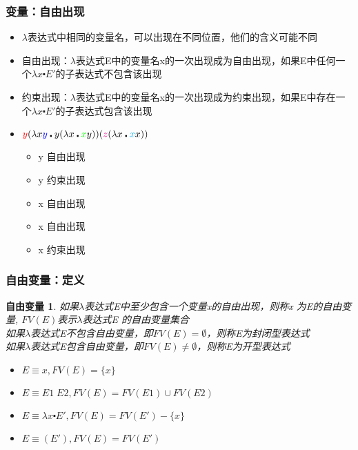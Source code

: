 \documentclass[CJKutf8,compress,hyperref]{beamer}
\begin{document}
\begin{CJK}{UTF8}{song}
\begin{frame} 
  \frametitle{变量：自由出现}  
  \begin{itemize}
  \item $\lambda$表达式中相同的变量名，可以出现在不同位置，他们的含义可能不同
  \item 自由出现：$\lambda$表达式E中的变量名x的一次出现成为自由出现，如果E中任何一个$\lambda x \centerdot E'$的子表达式不包含该出现 
  \item 约束出现：$\lambda$表达式E中的变量名x的一次出现成为约束出现，如果E中存在一个$\lambda x \centerdot E'$的子表达式包含该出现 
  \item ${\color{red}y}(\lambda x {\color{blue}y} \centerdot
    y (\lambda x \centerdot {\color{green}x}y))
    ({\color{magenta}z} (\lambda x \centerdot {\color{cyan}x}x))$ 
    \begin{itemize} 
    \item {\color{red}y} 自由出现
    \item {\color{blue}y} 约束出现 
    \item {\color{green}x} 自由出现 
    \item {\color{magenta}x} 自由出现 
    \item {\color{cyan}x} 约束出现 
    \end{itemize} 
  \end{itemize}  
\end{frame}

\begin{frame}
  \frametitle{自由变量：定义} 
  \newtheorem{fv}{自由变量} 
  \begin{fv}
    如果$\lambda$表达式E中至少包含一个变量x的自由出现，则称x
    为E的{\color{red}自由变量}, $FV(E)$表示$\lambda$表达式E
    的自由变量集合 \\ 
    如果$\lambda$表达式E不包含自由变量，即$FV(E) = \emptyset$，则称E为封闭型表达式\\ 
    如果$\lambda$表达式E包含自由变量，即$FV(E) \neq \emptyset$，则称E为开型表达式
  \end{fv} 
  \begin{itemize}
  \item  
    $E \equiv x , FV(E) = \{ x \}$
  \item       
    $E \equiv E1 \; E2,  FV(E) =  FV(E1) \cup FV(E2) $    
  \item
    $E \equiv \lambda x \centerdot E',  FV(E) =  FV(E')
    -\{ x \}     $
  \item
    $E \equiv (E'), FV(E) =  FV(E') $
  \end{itemize}
\end{frame}


\end{CJK}
\end{document}
